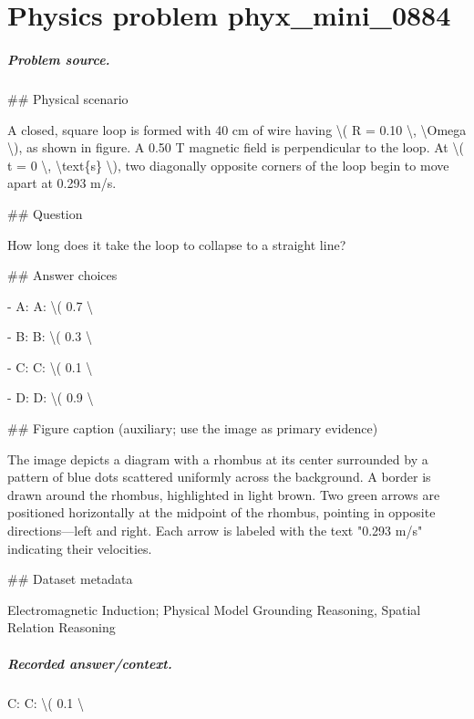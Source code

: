 
\chapter{Physics problem phyx\_mini\_0884}
\label{ch:PhyXMiniProblems_problem_phyx_mini_0884}

\paragraph{Problem source.}
\#\# Physical scenario

A closed, square loop is formed with 40 cm of wire having \textbackslash{}( R = 0.10 \textbackslash{}, \textbackslash{}Omega \textbackslash{}), as shown in figure. A 0.50 T magnetic field is perpendicular to the loop. At \textbackslash{}( t = 0 \textbackslash{}, \textbackslash{}text\{s\} \textbackslash{}), two diagonally opposite corners of the loop begin to move apart at 0.293 m/s.

\#\# Question

How long does it take the loop to collapse to a straight line?

\#\# Answer choices

- A: A: \textbackslash{}( 0.7 \textbackslash{}

- B: B: \textbackslash{}( 0.3 \textbackslash{}

- C: C: \textbackslash{}( 0.1 \textbackslash{}

- D: D: \textbackslash{}( 0.9 \textbackslash{}

\#\# Figure caption (auxiliary; use the image as primary evidence)

The image depicts a diagram with a rhombus at its center surrounded by a pattern of blue dots scattered uniformly across the background. A border is drawn around the rhombus, highlighted in light brown. Two green arrows are positioned horizontally at the midpoint of the rhombus, pointing in opposite directions—left and right. Each arrow is labeled with the text "0.293 m/s" indicating their velocities.

\#\# Dataset metadata

Electromagnetic Induction; Physical Model Grounding Reasoning, Spatial Relation Reasoning

\paragraph{Recorded answer/context.}
C: C: \textbackslash{}( 0.1 \textbackslash{}

